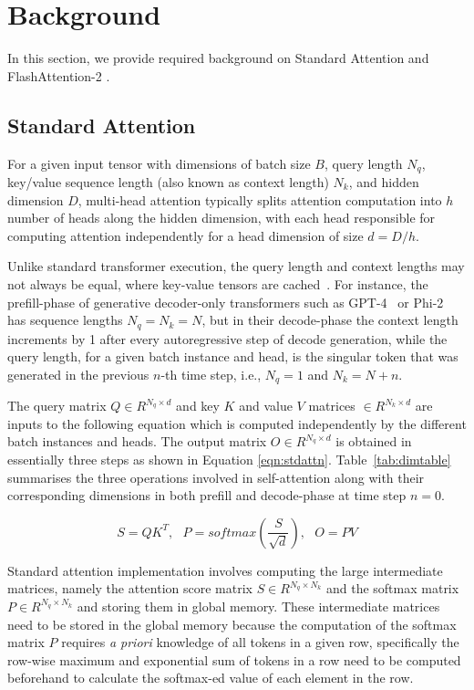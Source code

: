 \section{Background}
\label{sec:background}

In this section, we provide required background on Standard Attention \cite{vaswani2023attention} and FlashAttention-2 \cite{dao2023flashattention2}. 

\subsection{Standard Attention}

For a given input tensor with dimensions of batch size $B$, query length $N_q$, key/value sequence length (also known as context length) $N_k$, and hidden dimension $D$, multi-head attention typically splits attention computation into $h$ number of heads along the hidden dimension, with each head responsible for computing attention independently for a head dimension of size $d = D/h$. 

Unlike standard transformer execution, the query length and context lengths may not always be equal, where key-value tensors are cached~\cite{pope2023efficiently}. For instance, the prefill-phase of generative decoder-only transformers such as GPT-4~\cite{openai2024gpt4} or Phi-2~\cite{li2023textbooks} has sequence lengths $N_q = N_k = N$, but in their decode-phase the context length increments by 1 after every autoregressive step of decode generation, while the query length, for a given batch instance and head, is the singular token that was generated in the previous $n$-th time step, i.e., $N_q = 1$ and $N_k = N + n$.

The query matrix $Q \in R^{N_q \times d}$ and key $K$ and value $V$ matrices $\in R^{N_k \times d}$ are inputs to the following equation which is computed independently by the different batch instances and heads. The output matrix $O \in R^{N_q \times d}$ is obtained in essentially three steps as shown in Equation \ref{eqn:stdattn}. Table~\ref{tab:dimtable} summarises the three operations involved in self-attention along with their corresponding dimensions in both prefill and decode-phase at time step $n=0$.

\begin{equation}
    S = QK^T,\text{ } P = softmax(\frac{S}{\sqrt{d}}),\text{ } O = PV
    \label{eqn:stdattn}
\end{equation}

Standard attention implementation involves computing the large intermediate matrices, namely the attention score matrix $S \in R^{N_q \times N_k}$ and the softmax matrix $P\in R^{N_q \times N_k}$ and storing them in global memory. These intermediate matrices need to be stored in the global memory because the computation of the softmax matrix $P$ requires \textit{a priori} knowledge of all tokens in a given row, specifically the row-wise maximum and exponential sum of tokens in a row need to be computed beforehand to calculate the softmax-ed value of each element in the row.

